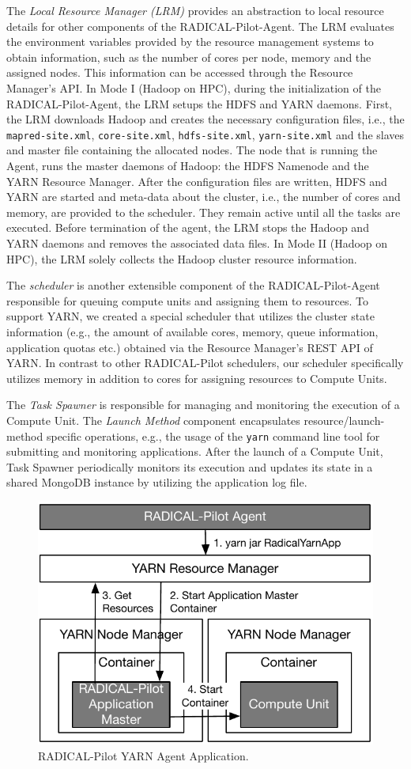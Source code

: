 The \emph{Local Resource Manager (LRM)} provides an abstraction to local
resource details for other components of the RADICAL-Pilot-Agent. The LRM
evaluates the environment variables provided by the resource management systems
to obtain information, such as the number of cores per node, memory and the
assigned nodes. This information can be accessed through the Resource Manager's
API. In Mode I (Hadoop on HPC), during the initialization of the
RADICAL-Pilot-Agent, the LRM setups the HDFS and YARN daemons. First, the LRM
downloads Hadoop and creates the necessary configuration files, i.e., the
\texttt{mapred-site.xml}, \texttt{core-site.xml}, \texttt{hdfs-site.xml},
\texttt{yarn-site.xml} and the slaves and master file containing the allocated
nodes. The node that is running the Agent, runs the master daemons of Hadoop:
the HDFS Namenode and the YARN Resource Manager. After the configuration files
are written, HDFS and YARN are started and meta-data about the cluster, i.e.,
the number of cores and memory, are provided to the scheduler. They remain
active until all the tasks are executed. Before termination of the agent, the
LRM stops the Hadoop and YARN daemons and removes the associated data files. In
Mode II (Hadoop on HPC), the LRM solely collects the Hadoop cluster resource
information.

The \emph{scheduler} is another extensible component of the RADICAL-Pilot-Agent
responsible for queuing compute units and assigning them to resources. To
support YARN, we created a special scheduler that utilizes the cluster state
information (e.g., the amount of available cores, memory, queue information,
application quotas etc.) obtained via the Resource Manager's REST API of YARN.
In contrast to other RADICAL-Pilot schedulers, our scheduler specifically
utilizes memory in addition to cores for assigning resources to Compute Units.

The \emph{Task Spawner} is responsible for managing and monitoring the execution
of a Compute Unit. The \emph{Launch Method} component encapsulates
resource/launch-method specific operations, e.g., the usage of the \texttt{yarn}
command line tool for submitting and monitoring applications. After the launch
of a Compute Unit, Task Spawner periodically monitors its execution and updates
its state in a shared MongoDB instance by utilizing the application log file.

\begin{figure}[t]
    \centering
    \includegraphics[width=.65\textwidth]{figures/data_analytics_hpc/hpc_hadoop/yarn.pdf}
    \caption{RADICAL-Pilot YARN Agent Application.}
    \label{fig:figures_yarn}
\end{figure}

